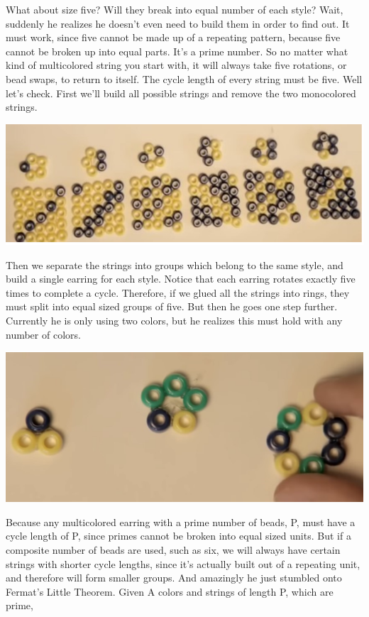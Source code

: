 \documentclass{report}
\begin{document}
 What about size five? Will they break into equal number of each style? Wait, suddenly he realizes he doesn't even need to build them in order to find out. It must work, since five cannot be made up of a repeating pattern, because five cannot be broken up into equal parts. It's a prime number. So no matter what kind of multicolored string you start with, it will always take five rotations, or bead swaps, to return to itself. The cycle length of every string must be five. Well let's check. First we'll build all possible strings and remove the two monocolored strings.
 \begin{center}
	\includegraphics[scale=1]{87.png}
\end{center}
 Then we separate the strings into groups which belong to the same style, and build a single earring for each style. Notice that each earring rotates exactly five times to complete a cycle. Therefore, if we glued all the strings into rings, they must split into equal sized groups of five. But then he goes one step further. Currently he is only using two colors, but he realizes this must hold with any number of colors. 
 \begin{center}
	\includegraphics[scale=1]{88.png}
\end{center}
Because any multicolored earring with a prime number of beads, P, must have a cycle length of P, since primes cannot be broken into equal sized units. But if a composite number of beads are used, such as six, we will always have certain strings with shorter cycle lengths, since it's actually built out of a repeating unit, and therefore will form smaller groups. And amazingly he just stumbled onto Fermat's Little Theorem. Given A colors and strings of length P, which are prime,
\end{document}

